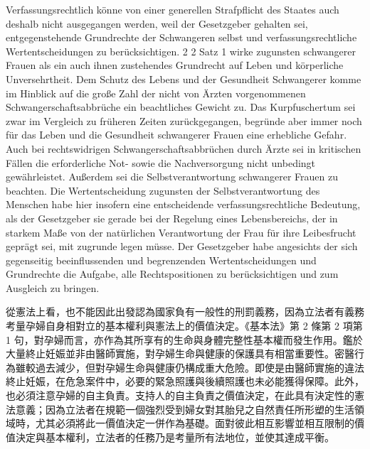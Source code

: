 \documentclass[12pt]{article}
\begin{document}
\syncleft
\begin{sourcepara}
Verfassungsrechtlich könne von einer generellen Strafpflicht des Staates auch deshalb nicht ausgegangen werden, weil der Gesetzgeber gehalten sei, entgegenstehende Grundrechte der Schwangeren selbst und verfassungsrechtliche Wertentscheidungen zu berücksichtigen. \abbrArt{} 2 \abbrAbs{} 2 Satz 1 \abbrGG{}\ggfnArtTwoTwoOneDE{} wirke zugunsten schwangerer Frauen als ein auch ihnen zustehendes Grundrecht auf Leben und körperliche Unversehrtheit. Dem Schutz des Lebens und der Gesundheit Schwangerer komme im Hinblick auf die große Zahl der nicht von Ärzten vorgenommenen Schwangerschaftsabbrüche ein beachtliches Gewicht zu. Das Kurpfuschertum sei zwar im Vergleich zu früheren Zeiten zurückgegangen, begründe aber immer noch für das Leben und die Gesundheit schwangerer Frauen eine erhebliche Gefahr. Auch bei rechtswidrigen Schwangerschaftsabbrüchen durch Ärzte sei in kritischen Fällen die erforderliche Not- sowie die Nachversorgung nicht unbedingt gewährleistet. Außerdem sei die Selbstverantwortung schwangerer Frauen zu beachten. Die Wertentscheidung zugunsten der Selbstverantwortung des Menschen habe hier insofern eine entscheidende verfassungsrechtliche Bedeutung, als der Gesetzgeber sie gerade bei der Regelung eines Lebensbereichs, der in starkem Maße von der natürlichen Verantwortung der Frau für ihre Leibesfrucht geprägt sei, mit zugrunde legen müsse. Der Gesetzgeber habe angesichts der sich gegenseitig beeinflussenden und begrenzenden Wertentscheidungen und Grundrechte die Aufgabe, alle Rechtspositionen zu berücksichtigen und zum Ausgleich zu bringen.
\end{sourcepara}
\begin{transpara}
從憲法上看，也不能因此出發認為國家負有一般性的刑罰義務，因為立法者有義務考量孕婦自身相對立的基本權利與憲法上的價值決定。《基本法》第 2 條第 2 項第 1 句\ggfnArtTwoTwoOneZH{}，對孕婦而言，亦作為其所享有的生命與身體完整性基本權而發生作用。鑑於大量終止妊娠並非由醫師實施，對孕婦生命與健康的保護具有相當重要性。密醫行為雖較過去減少，但對孕婦生命與健康仍構成重大危險。即使是由醫師實施的違法終止妊娠，在危急案件中，必要的緊急照護與後續照護也未必能獲得保障。此外，也必須注意孕婦的自主負責。支持人的自主負責之價值決定，在此具有決定性的憲法意義；因為立法者在規範一個強烈受到婦女對其胎兒之自然責任所形塑的生活領域時，尤其必須將此一價值決定一併作為基礎。面對彼此相互影響並相互限制的價值決定與基本權利，立法者的任務乃是考量所有法地位，並使其達成平衡。
\end{transpara}
\end{document}
